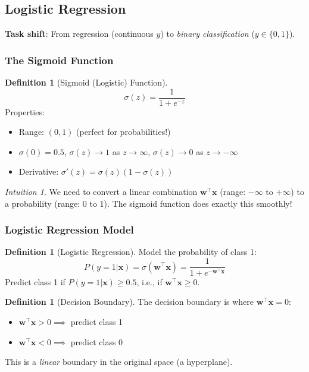 \documentclass[11pt,twoside]{article}
\numberwithin{equation}{section}
\newcommand{\vect}[1]{\bm{#1}}
\theoremstyle{plain}
\theoremstyle{definition}
\newtheorem{definition}[theorem]{Definition}
\theoremstyle{remark}
\newtheorem{intuition}[theorem]{Intuition}
\begin{document}
\subsection{Logistic Regression}

\textbf{Task shift}: From regression (continuous $y$) to \emph{binary classification} ($y \in \{0, 1\}$).

\subsubsection{The Sigmoid Function}

\begin{definition}[Sigmoid (Logistic) Function]
\[
\sigma(z) = \frac{1}{1 + e^{-z}}
\]
Properties:
\begin{itemize}
\item Range: $(0, 1)$ (perfect for probabilities!)
\item $\sigma(0) = 0.5$, $\sigma(z) \to 1$ as $z \to \infty$, $\sigma(z) \to 0$ as $z \to -\infty$
\item Derivative: $\sigma'(z) = \sigma(z)(1 - \sigma(z))$
\end{itemize}
\end{definition}

\begin{intuition}
We need to convert a linear combination $\vect{w}^\top\vect{x}$ (range: $-\infty$ to $+\infty$) to a probability (range: 0 to 1). The sigmoid function does exactly this smoothly!
\end{intuition}

\subsubsection{Logistic Regression Model}

\begin{definition}[Logistic Regression]
Model the probability of class 1:
\[
P(y = 1 | \vect{x}) = \sigma(\vect{w}^\top\vect{x}) = \frac{1}{1 + e^{-\vect{w}^\top\vect{x}}}
\]
Predict class 1 if $P(y=1|\vect{x}) \geq 0.5$, i.e., if $\vect{w}^\top\vect{x} \geq 0$.
\end{definition}

\begin{definition}[Decision Boundary]
The decision boundary is where $\vect{w}^\top\vect{x} = 0$:
\begin{itemize}
\item $\vect{w}^\top\vect{x} > 0 \implies$ predict class 1
\item $\vect{w}^\top\vect{x} < 0 \implies$ predict class 0
\end{itemize}
This is a \emph{linear} boundary in the original space (a hyperplane).
\end{definition}
\end{document}

